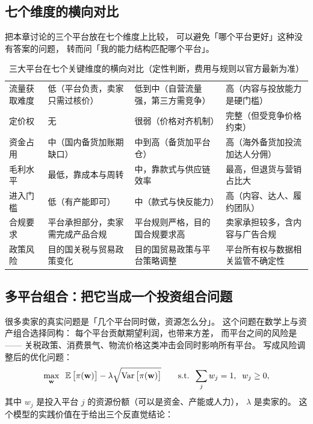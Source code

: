 \subsection{七个维度的横向对比}

把本章讨论的三个平台放在七个维度上比较，
可以避免「哪个平台更好」这种没有答案的问题，
转而问「我的能力结构匹配哪个平台」。

\begin{table}[htbp]
\centering
\caption{三大平台在七个关键维度的横向对比（定性判断，费用与规则以官方最新为准）}
\label{tab:plat-matrix}
\scriptsize
\begin{tabularx}{\textwidth}{L{1.7cm} Y Y Y}
\toprule
{} &  &  &  \\
\midrule
流量获取难度 & 低（平台负责，卖家只需过核价） & 低到中（自营流量强，第三方需竞争） & 高（内容与投放能力是硬门槛） \\
\addlinespace
定价权 & 无 & 很弱（价格对齐机制） & 完整（但受竞争价格约束） \\
\addlinespace
资金占用 & 中（国内备货加账期缺口） & 中到高（备货加平台仓） & 高（海外备货加投流加达人分佣） \\
\addlinespace
毛利水平 & 最低，靠成本与周转 & 中，靠款式与供应链效率 & 最高，但退货与营销占比大 \\
\addlinespace
进入门槛 & 低（有产能即可） & 中（款式与快反能力） & 高（内容、达人、履约团队） \\
\addlinespace
合规要求 & 平台承担部分，卖家需完成产品合规 & 平台规则严格，目的国合规要求高 & 卖家承担较多，含内容与广告合规 \\
\addlinespace
政策风险 & 目的国关税与贸易政策变化 & 目的国贸易政策与平台策略调整 & 平台所有权与数据相关监管不确定性 \\
\bottomrule
\end{tabularx}
\end{table}

\subsection{多平台组合：把它当成一个投资组合问题}

很多卖家的真实问题是「几个平台同时做，资源怎么分」。
这个问题在数学上与资产组合选择同构：
每个平台贡献期望利润，也带来方差，
而平台之间的风险是——
关税政策、消费景气、物流价格这类冲击会同时影响所有平台。
写成风险调整后的优化问题：
\begin{equation}
\max_{\mathbf{w}} \;\; \operatorname{\mathbb{E}}\big[\pi(\mathbf{w})\big] - \lambda \sqrt{\operatorname{Var}\big[\pi(\mathbf{w})\big]}
\qquad
\text{s.t.} \;\; \sum_{j} w_{j} = 1,\;\; w_{j} \ge 0 ,
\label{eq:plat-portfolio}
\end{equation}
其中 $w_{j}$ 是投入平台 $j$ 的资源份额（可以是资金、产能或人力），
$\lambda$ 是卖家的。
这个模型的实践价值在于给出三个反直觉结论：

